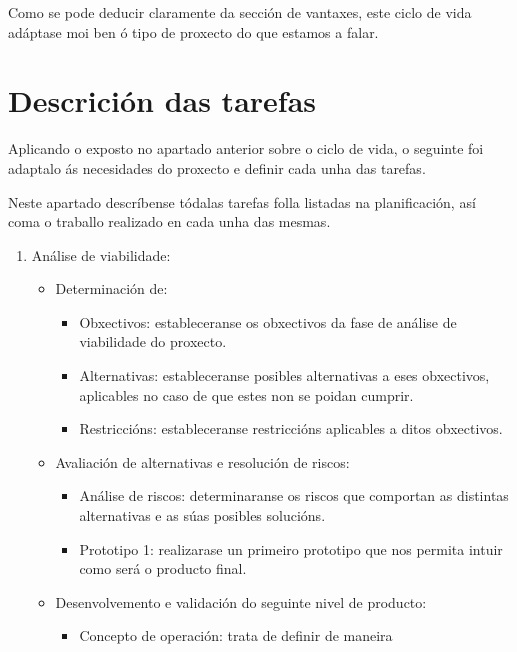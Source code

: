 Como se pode deducir claramente da sección de vantaxes, este ciclo de vida
adáptase moi ben ó tipo de proxecto do que estamos a falar.

\section{Descrición das tarefas}

Aplicando o exposto no apartado anterior sobre o ciclo de vida, o seguinte foi
adaptalo ás necesidades do proxecto e definir cada unha das tarefas.

Neste apartado descríbense tódalas tarefas folla listadas na planificación, así
coma o traballo realizado en cada unha das mesmas.

\begin{enumerate}
 \item Análise de viabilidade:
       \begin{itemize}
        \item Determinación de:
              \begin{itemize}
               \item Obxectivos: estableceranse os obxectivos da fase de
                     análise de viabilidade do proxecto.
               \item Alternativas: estableceranse posibles alternativas a eses
                     obxectivos, aplicables no caso de que estes non se poidan
                     cumprir.
               \item Restriccións: estableceranse restriccións aplicables a
                     ditos obxectivos.
              \end{itemize}
        \item Avaliación de alternativas e resolución de riscos:
              \begin{itemize}
               \item Análise de riscos: determinaranse os riscos que comportan
                     as distintas alternativas e as súas posibles solucións.
               \item Prototipo 1: realizarase un primeiro prototipo que nos
                     permita intuir como será o producto final.
              \end{itemize}
        \item Desenvolvemento e validación do seguinte nivel de
              producto:
              \begin{itemize}
               \item Concepto de operación: trata de definir de maneira

\end{itemize}
\end{itemize}
\end{enumerate}
